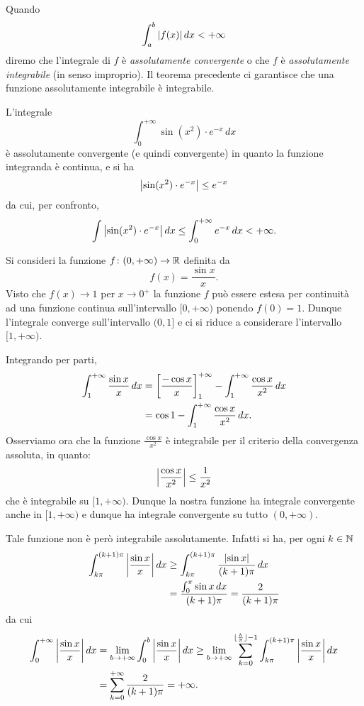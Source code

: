\begin{definition}
%
%
%
%
%
Quando
\[
  \int_a^b {\left|f(x)\right|}\, dx <+\infty
\]
diremo che l'integrale di $f$ è \emph{assolutamente convergente}
o che $f$ è \emph{assolutamente integrabile} (in senso improprio).
Il teorema
precedente ci garantisce che una funzione assolutamente integrabile
è integrabile.
\end{definition}

\begin{example}
L'integrale
\[
  \int_0^{+\infty} \sin(x^2)\cdot e^{-x}\, dx
\]
è assolutamente convergente (e quindi convergente)
in quanto la funzione integranda è continua,
e si ha
\[
 {\left|\sin(x^2)\cdot e^{-x}\right|} \le e^{-x}
\]
da cui, per confronto,
\[
 \int {\left|\sin(x^2)\cdot e^{-x}\right|}\, dx  \le
  \int_0^{+\infty} e^{-x}\, dx < +\infty.
\]
\end{example}

\begin{example}
\label{ex:48864}%
\mymark{*}%
Si consideri la funzione $f\colon (0,+\infty) \to \mathbb R$
definita da
\[
  f(x) = \frac{\sin x }{x}.
\]
Visto che $f(x)\to 1$ per $x\to 0^+$ la funzione $f$
può essere estesa per continuità ad una funzione continua sull'intervallo
$[0,+\infty)$ ponendo $f(0)=1$.
Dunque l'integrale converge sull'intervallo $(0,1]$ e ci si
riduce a considerare l'intervallo $[1,+\infty)$.

Integrando per parti,
\begin{align*}
  \int_1^{+\infty} \frac{\sin x}{x}\, dx
  &= {\left[ \frac{-\cos x}{x} \right]}_1^{+\infty} -
  \int_1^{+\infty} \frac{\cos x}{x^2} \, dx \\
  &= \cos 1 - \int_1^{+\infty} \frac{\cos x}{x^2}\, dx.
\end{align*}
Osserviamo ora che la funzione $\frac{\cos x}{x^2}$ è integrabile
per il criterio della convergenza assoluta, in quanto:
\[
  {\left|\frac{\cos x}{x^2}\right|} \le \frac{1}{x^2}
\]
che è integrabile su $[1,+\infty)$.
Dunque la nostra funzione ha integrale convergente anche in $[1,+\infty)$
e dunque ha integrale convergente su tutto $(0,+\infty)$.

Tale funzione non è però integrabile assolutamente.
Infatti si ha,
per ogni $k\in \mathbb N$
\begin{align*}
  \int_{k\pi}^{(k+1)\pi} {\left|\frac{\sin x} x\right|}\, dx
  &\ge \int_{k\pi}^{(k+1)\pi} \frac{{\left|\sin x\right|}}{(k+1)\pi}\, dx\\
  &= \frac{\int_0^\pi \sin x \, dx}{(k+1)\pi}
  = \frac{2}{(k+1)\pi}
\end{align*}
da cui
\begin{align*}
  \int_0^{+\infty} {\left|\frac{\sin x}{x}\right|}\, dx
  & = \lim_{b\to +\infty} \int_0^b {\left|\frac{\sin x}{x}\right|}\, dx 
  \ge \lim_{b\to+\infty} \sum_{k=0}^{\lfloor \frac{b}{\pi}\rfloor-1} \int_{k\pi}^{(k+1)\pi}{\left|\frac{\sin x} x\right|}\, dx\\
  &= \sum_{k=0}^{+\infty} \frac{2}{(k+1)\pi} = +\infty.
\end{align*}
\end{example}

